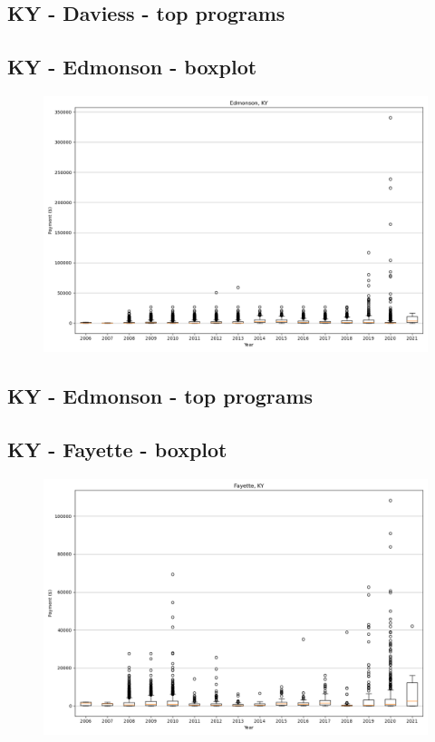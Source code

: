 \subsection*{KY - Daviess - top programs}

\newpage
\subsection*{KY - Edmonson - boxplot}
\begin{figure}[h]
\centering
\includegraphics[width=7in]{../output/boxplots/counties/Edmonson-KY_boxplot.png}
\end{figure}


\subsection*{KY - Edmonson - top programs}

\newpage
\subsection*{KY - Fayette - boxplot}
\begin{figure}[h]
\centering
\includegraphics[width=7in]{../output/boxplots/counties/Fayette-KY_boxplot.png}
\end{figure}


